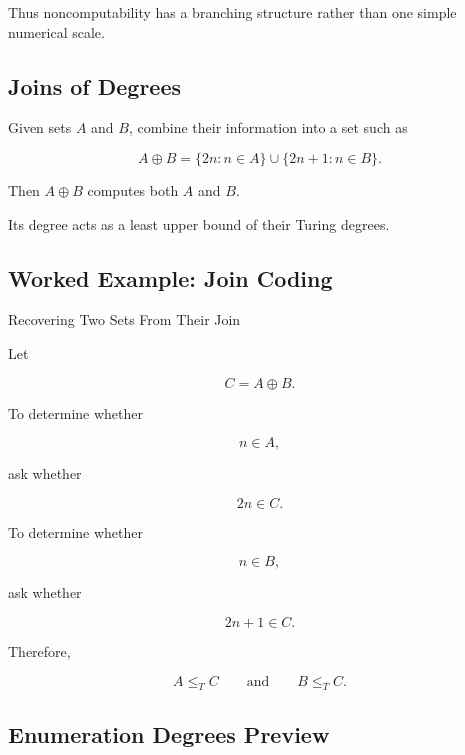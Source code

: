 Thus noncomputability has a branching structure rather than one simple
numerical scale.

\subsection{Joins of Degrees}
\label{subsec:join-turing-degrees}

Given sets \(A\) and \(B\), combine their information into a set such as

\[
\boxed{
A\oplus B
=
\{2n:n\in A\}
\cup
\{2n+1:n\in B\}.
}
\]

Then \(A\oplus B\) computes both \(A\) and \(B\).

Its degree acts as a least upper bound of their Turing degrees.

\subsection{Worked Example: Join Coding}
\label{subsec:worked-degree-join}

\begin{workedexamplebox}{Recovering Two Sets From Their Join}

Let

\[
C=A\oplus B.
\]

To determine whether

\[
n\in A,
\]

ask whether

\[
2n\in C.
\]

To determine whether

\[
n\in B,
\]

ask whether

\[
2n+1\in C.
\]

Therefore,

\begin{answerbox}
\[
\boxed{
A\leq_TC
\qquad\text{and}\qquad
B\leq_TC.
}
\]
\end{answerbox}

\end{workedexamplebox}

\subsection{Enumeration Degrees Preview}
\label{subsec:enumeration-degrees-preview}

